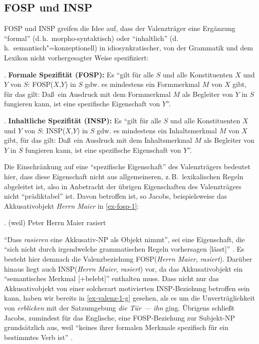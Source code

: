 \subsection{FOSP und INSP}

FOSP und INSP greifen die Idee auf, dass der Valenzträger eine Ergänzung "`formal"' (d.\,h.\ morpho-syntaktisch) oder "`inhaltlich"' (d.\,h.\ semantisch"=konzeptionell) in idiosynkratischer, von der Grammatik und dem Lexikon nicht vorhergesagter Weise spezifiziert:

\ex. {\bf Formale Spezifität (FOSP):}  Es "`gilt für alle $S$ und alle Konstituenten $X$ und $Y$ von $S$: FOSP($X$,$Y$) in $S$ gdw. es mindestens ein Formmerkmal $M$ von $X$ gibt, für das gilt: Da\ss \ ein Ausdruck mit dem Formmerkmal $M$ als Begleiter von $Y$ in $S$ fungieren kann, ist eine spezifische Eigenschaft von $Y$"'. \citep[22]{Jacobs:94}

\ex. {\bf Inhaltliche Spezifität (INSP):} Es "`gilt für alle $S$ und alle Konstituenten $X$ und $Y$ von $S$: INSP($X$,$Y$) in $S$ gdw. es mindestens ein Inhaltsmerkmal $M$ von $X$ gibt, für das gilt: Da\ss \ ein Ausdruck mit dem Inhaltsmerkmal $M$ als Begleiter von $Y$ in $S$ fungieren kann, ist eine spezifische Eigenschaft von $Y$"'. \citep[22]{Jacobs:94}

Die Einschränkung auf eine "`spezifische Eigenschaft"' des Valenzträgers bedeutet hier, dass diese Eigenschaft nicht aus allgemeineren, z.\,B.\ lexikalischen Regeln abgeleitet ist, also in Anbetracht der übrigen Eigenschaften des Valenzträgers nicht "`prädiktabel"' ist. Davon betroffen ist, so Jacobs, beispielsweise das Akkusativobjekt {\it Herrn Maier} in \ref{ex-fosp-1}:

\ex. \label{ex-fosp-1}(weil) Peter Herrn Maier rasiert 

"`Dass {\it rasieren} eine Akkusativ-NP als Objekt nimmt"', sei eine Eigenschaft, die "`sich nicht durch irgendwelche grammatischen Regeln vorhersagen [lässt]"' \citep[23]{Jacobs:94}.  Es besteht hier demnach die Valenzbeziehung FOSP({\it Herrn Maier}, {\it rasiert}). Darüber hinaus liegt auch INSP({\it Herrn Maier}, {\it rasiert}) vor, da das Akkusativobjekt ein "`semantisches Merkmal [+belebt]"'  enthalten muss. Dass nicht nur das Akkusativobjekt von einer solcherart motivierten INSP-Bezie\-hung betroffen sein kann, haben wir bereits in \ref{ex-valenz-1-g} gesehen, als es um die Unverträglichkeit von {\it erblicken} mit der Satzumgebung \textit{die Tür --- ihn} ging. Übrigens schließt Jacobs, zumindest für das Englische, eine FOSP-Beziehung zur Subjekt-NP grundsätzlich aus, weil "`keines ihrer formalen Merkmale spezifisch für ein bestimmtes Verb ist"' \citep[37]{Jacobs:94}.

